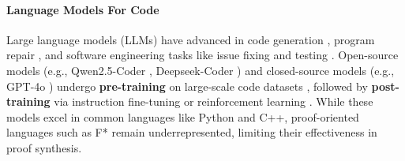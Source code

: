 \paragraph{Language Models For Code}
Large language models (LLMs) have advanced in code generation \cite{chen2021evaluating,austin2021program}, program repair \cite{xia2022less,xia2023automated,jin2023inferfix}, and software engineering tasks like issue fixing \cite{jimenez2023swe} and testing \cite{deng2023large}. Open-source models (e.g., Qwen2.5-Coder \cite{hui2024qwen2}, Deepseek-Coder \cite{guo2024deepseek}) and closed-source models (e.g., GPT-4o \cite{hurst2024gpt}) undergo \textbf{pre-training} on large-scale code datasets \cite{radford2018improving,nijkamp2022codegen}, followed by \textbf{post-training} via instruction fine-tuning \cite{muennighoff2023octopack,roziere2023code,luo2023wizardcoder,codealpaca} or reinforcement learning \cite{ouyang2022training,bai2022training}. While these models excel in common languages like Python and C++, proof-oriented languages such as F* \cite{swamy2011secure} remain underrepresented, limiting their effectiveness in proof synthesis.



